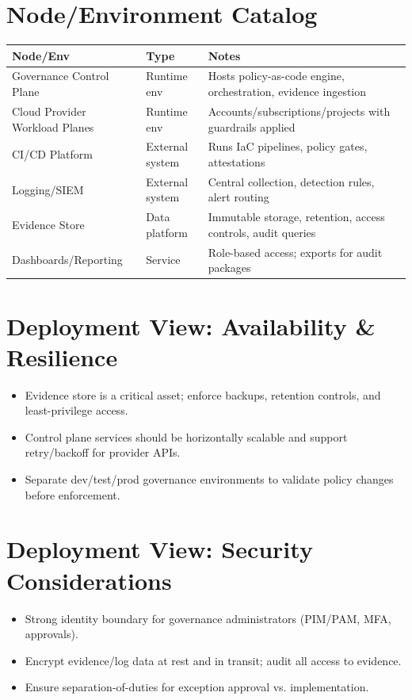 \documentclass[11pt]{report}
\begin{document}
\section{Node/Environment Catalog}
\begin{tabularx}{\textwidth}{@{}l l >{\raggedright\arraybackslash}X@{}}
\toprule
\textbf{Node/Env} & \textbf{Type} & \textbf{Notes} \\
\midrule
Governance Control Plane & Runtime env & Hosts policy-as-code engine, orchestration, evidence ingestion \\
Cloud Provider Workload Planes & Runtime env & Accounts/subscriptions/projects with guardrails applied \\
CI/CD Platform & External system & Runs IaC pipelines, policy gates, attestations \\
Logging/SIEM & External system & Central collection, detection rules, alert routing \\
Evidence Store & Data platform & Immutable storage, retention, access controls, audit queries \\
Dashboards/Reporting & Service & Role-based access; exports for audit packages \\
\bottomrule
\end{tabularx}

\section{Deployment View: Availability \& Resilience}
\begin{itemize}
  \item Evidence store is a critical asset; enforce backups, retention controls, and least-privilege access.
  \item Control plane services should be horizontally scalable and support retry/backoff for provider APIs.
  \item Separate dev/test/prod governance environments to validate policy changes before enforcement.
\end{itemize}

\section{Deployment View: Security Considerations}
\begin{itemize}
  \item Strong identity boundary for governance administrators (PIM/PAM, MFA, approvals).
  \item Encrypt evidence/log data at rest and in transit; audit all access to evidence.
  \item Ensure separation-of-duties for exception approval vs. implementation.
\end{itemize}
\end{document}
